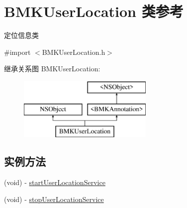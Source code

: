 \hypertarget{interface_b_m_k_user_location}{\section{B\-M\-K\-User\-Location 类参考}
\label{interface_b_m_k_user_location}
}


定位信息类  




{\ttfamily \#import $<$B\-M\-K\-User\-Location.\-h$>$}

继承关系图 B\-M\-K\-User\-Location\-:\begin{figure}[H]
\begin{center}
\leavevmode
\includegraphics[height=3.000000cm]{interface_b_m_k_user_location}
\end{center}
\end{figure}
\subsection*{实例方法}
\begin{DoxyCompactItemize}
\item 
(void) -\/ \hyperlink{interface_b_m_k_user_location_af09738dd97cd9c819d88b1ecc78ef7de}{start\-User\-Location\-Service}
\item 
(void) -\/ \hyperlink{interface_b_m_k_user_location_a59748e02d4b65fc82e78498de8a00701}{stop\-User\-Location\-Service}
\end{DoxyCompactItemize}
